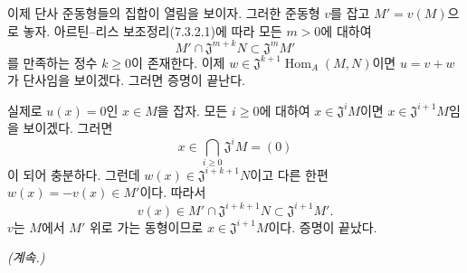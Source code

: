 이제 단사 준동형들의 집합이 열림을 보이자. 그러한 준동형 $v$를 잡고
$M'=v(M)$으로 놓자. 아르틴--리스 보조정리(7.3.2.1)에 따라 모든
$m>0$에 대하여
\[
  M'\cap\mathfrak J^{m+k}N\subset\mathfrak J^mM'
\]
를 만족하는 정수 $k\geq0$이 존재한다. 이제
$w\in\mathfrak J^{k+1}\operatorname{Hom}_A(M,N)$이면
$u=v+w$가 단사임을 보이겠다. 그러면 증명이 끝난다.

실제로 $u(x)=0$인 $x\in M$을 잡자. 모든 $i\geq0$에 대하여
$x\in\mathfrak J^iM$이면 $x\in\mathfrak J^{i+1}M$임을 보이겠다.
그러면
\[
  x\in\bigcap_{i\geq0}\mathfrak J^iM=(0)
\]
이 되어 충분하다. 그런데
$w(x)\in\mathfrak J^{i+k+1}N$이고 다른 한편
$w(x)=-v(x)\in M'$이다. 따라서
\[
  v(x)\in
  M'\cap\mathfrak J^{i+k+1}N
  \subset\mathfrak J^{i+1}M'.
\]
$v$는 $M$에서 $M'$ 위로 가는 동형이므로
$x\in\mathfrak J^{i+1}M$이다. 증명이 끝났다.

\begin{flushright}
\emph{(계속.)}
\end{flushright}
